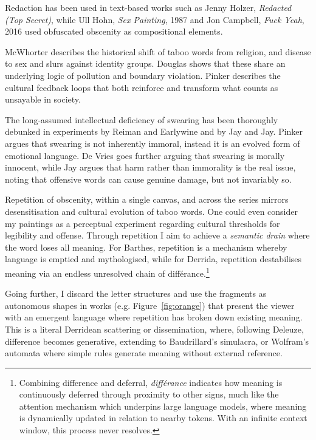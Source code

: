 \documentclass[12pt]{article}
\begin{document}
Redaction has been used in text-based works such as Jenny Holzer,
\emph{Redacted (Top Secret)}, while Ull Hohn, \emph{Sex Painting},
1987 and Jon Campbell, \emph{Fuck Yeah}, 2016 used obfuscated obscenity
as compositional elements.

McWhorter describes the historical shift of taboo words from religion,
and disease to sex and slurs against identity
groups.\cite{mcwhorter2024nine} Douglas shows that these share an
underlying logic of pollution and boundary violation.\cite{douglas1966purity}
Pinker describes the cultural feedback loops that both reinforce and
transform what counts as unsayable in society\cite{pinker2008seven}.

The long-assumed intellectual deficiency of swearing has been
thoroughly debunked in experiments by Reiman and
Earlywine\cite{reiman2022swearfluency} and by Jay and
Jay.\cite{jay2015taboo} Pinker argues that
swearing is not inherently immoral, instead it is an evolved form of
emotional language.\cite{pinker2017moral} De Vries goes further arguing that swearing is
morally innocent,\cite{devries2023swearing} while Jay argues that harm
rather than immorality is the real issue, noting that offensive words
can cause genuine damage, but not invariably so.\cite{jay2009offensive}

Repetition of obscenity, within a single canvas, and across the series
mirrors desensitisation and cultural evolution of taboo words. One
could even consider my paintings as a perceptual experiment regarding
cultural thresholds for legibility and offense.  Through repetition I
aim to achieve a \emph{semantic drain} where the word loses all
meaning. For Barthes, repetition is a mechanism whereby language is
emptied and mythologised,\cite{barthes1957mythologies} while for
Derrida,\cite{derrida1972dissemination} repetition destabilises
meaning via an endless unresolved chain of
diff\'erance.\footnote{Combining difference and deferral,
  \emph{diff\'erance} indicates how meaning is continuously deferred
  through proximity to other signs, much like the attention mechanism
  which underpins large language models, where meaning is dynamically
  updated in relation to nearby tokens. With an infinite context
  window, this process never resolves.}

Going further, I discard the letter structures and use the fragments
as autonomous shapes in works (e.g. Figure~\ref{fig:orange}) that
present the viewer with an emergent language where repetition has
broken down existing meaning. This is a literal Derridean scattering
or dissemination,\cite{derrida1972dissemination} where, following
Deleuze,\cite{deleuze1968difference} difference becomes generative,
extending to Baudrillard's simulacra,\cite{baudrillard1981simulacra}
or Wolfram's automata\cite{wolfram} where simple rules generate
meaning without external reference.
\end{document}
